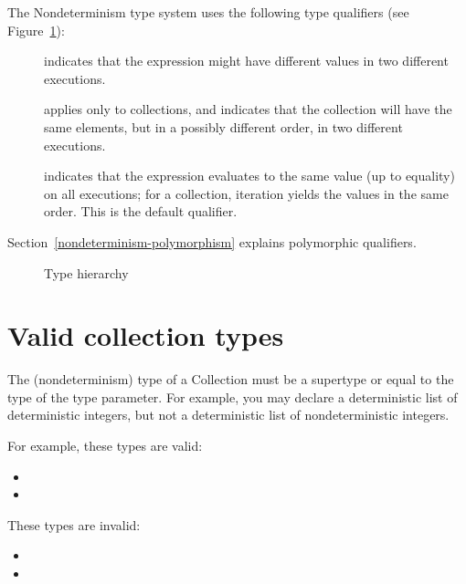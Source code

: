 The Nondeterminism type system uses the following type qualifiers (see Figure~\ref{fig-hierarchy}):
\begin{description}
\item[] indicates
  that the expression might have different values in two different executions.
\item[] applies only
  to collections, and indicates that the collection will have the same
  elements, but in a possibly different order, in two different executions.
\item[] indicates that
  the expression evaluates to the same value (up to equality) on all
  executions; for a collection, iteration yields the values in the same
  order.
  This is the default qualifier.
\end{description}

Section~\ref{nondeterminism-polymorphism} explains polymorphic qualifiers.

\begin{figure}
  \begin{center}
  \end{center}
\caption{Type hierarchy}
\label{fig-hierarchy}
\end{figure}


\section{Valid collection types\label{nondeterminism-collection-types}}

The (nondeterminism) type of a Collection must be a supertype or equal to
the type of the type parameter.  For example, you may declare a
deterministic list of deterministic integers, but not a deterministic
list of nondeterministic integers.

For example, these types are valid:
\begin{itemize}
    \item {}
    \item {}\code{>}
\end{itemize}

These types are invalid:
  \begin{itemize}
    \item {}
    \item {}
  \end{itemize}

